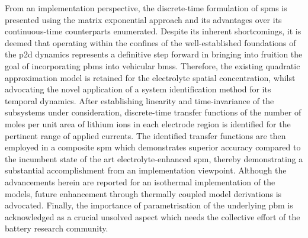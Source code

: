From an implementation perspective, the discrete-time formulation of \glspl{spm}
is presented  using the matrix  exponential approach and its  advantages over
its continuous-time counterparts enumerated.  Despite its inherent shortcomings,
it  is  deemed  that  operating  within the  confines  of  the  well-established
foundations of  the \gls{p2d} dynamics  represents a definitive step  forward in
bringing  into fruition  the goal  of incorporating  \glspl{pbm} into  vehicular
\glspl{bms}. Therefore,  the existing quadratic approximation  model is retained
for  the   electrolyte  spatial  concentration,  whilst   advocating  the  novel
application  of  a  system  identification method  for  its  temporal  dynamics.
After  establishing  linearity  and  time-invariance  of  the  subsystems  under
consideration, discrete-time transfer functions of  the number of moles per unit
area of  lithium ions in each  electrode region is identified  for the pertinent
range of applied  currents. The identified transfer functions  are then employed
in a  composite \gls{spm} which  demonstrates superior accuracy compared  to the
incumbent state of the art electrolyte-enhanced \gls{spm}, thereby demonstrating
a  substantial accomplishment  from  an implementation  viewpoint. Although  the
advancements herein are reported for an isothermal implementation of the models,
future  enhancement through  thermally coupled  model derivations  is advocated.
Finally,  the  importance of  parametrisation  of  the underlying  \gls{pbm}  is
acknowledged as a  crucial unsolved aspect which needs the  collective effort of
the battery research community.

\cleardoublepage

